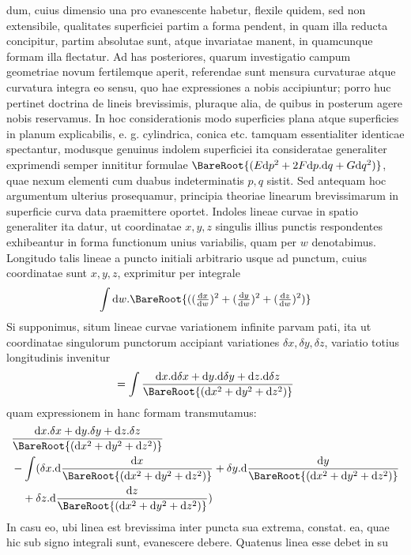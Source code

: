 %
dum, cuius dimensio una pro evanescente habetur, flexile quidem, sed non extensibile, qualitates superficiei partim a forma pendent, in quam illa reducta concipitur, partim absolutae sunt, atque invariatae manent, in quamcunque formam illa flectatur. Ad has posteriores, quarum investigatio campum geometriae novum fertilemque aperit, referendae sunt mensura curvaturae atque curvatura integra eo sensu, quo hae expressiones a nobis accipiuntur; porro huc pertinet doctrina de lineis brevissimis, pluraque alia, de quibus in posterum agere nobis reservamus. In hoc considerationis modo superficies plana atque superficies in planum explicabilis, e. g. cylindrica, conica etc. tamquam essentialiter identicae spectantur, modusque genuinus indolem superficiei ita consideratae generaliter exprimendi semper innititur formulae \(\BareRoot{(E\mathrm{d}p^2+2F\mathrm{d}p\mathord{.}\mathrm{d}q+G\mathrm{d}q^2)}\), quae nexum elementi cum duabus indeterminatis \(p,q\) sistit. Sed antequam hoc argumentum ulterius prosequamur, principia theoriae linearum brevissimarum in superficie curva data praemittere oportet.
Indoles lineae curvae in spatio generaliter ita datur, ut coordinatae \(x,y,z\) singulis illius punctis respondentes exhibeantur in forma functionum unius variabilis, quam per \(w\) denotabimus. Longitudo talis lineae a puncto initiali arbitrario usque ad punctum, cuius coordinatae sunt \(x,y,z\), exprimitur per integrale
\[
\int\mathrm{d}w\mathord{.}\BareRoot{((\tfrac{\mathrm{d}x}{\mathrm{d}w})^2+(\tfrac{\mathrm{d}y}{\mathrm{d}w})^2+(\tfrac{\mathrm{d}z}{\mathrm{d}w})^2)}
\]
Si supponimus, situm lineae curvae variationem infinite parvam pati, ita ut coordinatae singulorum punctorum accipiant variationes \(\delta x,\delta y,\delta z\), variatio totius longitudinis invenitur
\[
=\int\frac{\mathrm{d}x\mathord{.}\mathrm{d}\delta x+\mathrm{d}y\mathord{.}\mathrm{d}\delta y+\mathrm{d}z\mathord{.}\mathrm{d}\delta z}{\BareRoot{(\mathrm{d}x^2+\mathrm{d}y^2+\mathrm{d}z^2)}}
\]
quam expressionem in hanc formam transmutamus:
\[
\begin{aligned}
&\frac{\mathrm{d}x\mathord{.}\delta x+\mathrm{d}y\mathord{.}\delta y+\mathrm{d}z\mathord{.}\delta z}{\BareRoot{(\mathrm{d}x^2+\mathrm{d}y^2+\mathrm{d}z^2)}}\\
&-\int(\delta x\mathord{.}\mathrm{d}\frac{\mathrm{d}x}{\BareRoot{(\mathrm{d}x^2+\mathrm{d}y^2+\mathrm{d}z^2)}}+\delta y\mathord{.}\mathrm{d}\frac{\mathrm{d}y}{\BareRoot{(\mathrm{d}x^2+\mathrm{d}y^2+\mathrm{d}z^2)}}\\
&\quad+\delta z\mathord{.}\mathrm{d}\frac{\mathrm{d}z}{\BareRoot{(\mathrm{d}x^2+\mathrm{d}y^2+\mathrm{d}z^2)}})
\end{aligned}
\]
In casu eo, ubi linea est brevissima inter puncta sua extrema, constat. ea, quae hic sub signo integrali sunt, evanescere debere. Quatenus linea esse debet in su%
